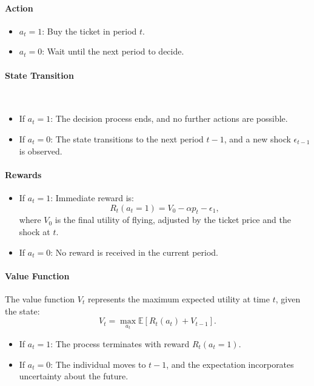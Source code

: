\documentclass[12pt]{article}
\begin{document}
\paragraph{Action}
\begin{itemize}
    \item \( a_t = 1 \): Buy the ticket in period \( t \).
    \item \( a_t = 0 \): Wait until the next period to decide.
\end{itemize}

\paragraph{State Transition}\
\begin{itemize}
    \item If \( a_t = 1 \): The decision process ends, and no further actions are
          possible.
    \item If \( a_t = 0 \): The state transitions to the next period \( t - 1 \), and a
          new shock \(\epsilon_{t-1}\) is observed.
\end{itemize}

\paragraph{Rewards}
\begin{itemize}
    \item If \( a_t = 1 \): Immediate reward is:
          \[
              R_t(a_t = 1) = V_0 - \alpha p_t - \epsilon_1,
          \]
          where \( V_0 \) is the final utility of flying, adjusted by the ticket price
          and the shock at \( t \).
    \item If \( a_t = 0 \): No reward is received in the current period.
\end{itemize}

\paragraph{Value Function} The value function \( V_t \) represents the maximum expected utility at time \(
t \), given the state:
\[
    V_t = \max_{a_t} \mathbb{E}[R_t(a_t) + V_{t-1}].
\]
\begin{itemize}
    \item If \( a_t = 1 \): The process terminates with reward \( R_t(a_t = 1) \).
    \item If \( a_t = 0 \): The individual moves to \( t - 1 \), and the expectation
          incorporates uncertainty about the future.
\end{itemize}
\end{document}
